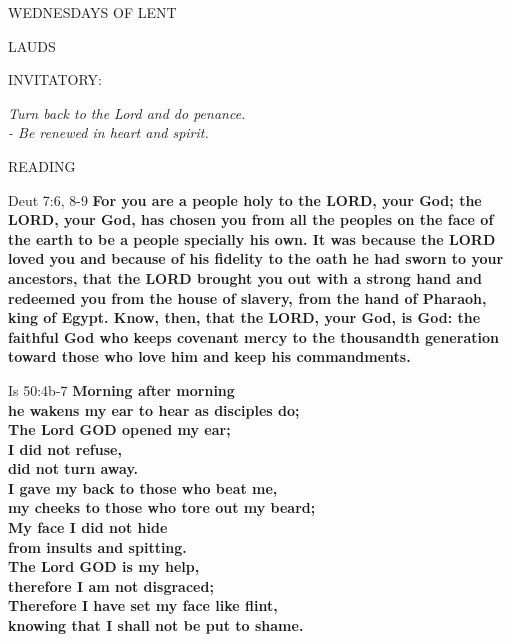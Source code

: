 \begin{center}
\normalsize WEDNESDAYS OF LENT
\end{center}

\begin{flushleft}\normalsize{\uppercase{LAUDS\\}}\end{flushleft}
\small{\uppercase{INVITATORY:}}\normalsize
\begin{center}
\textit{Turn back to the Lord and do penance.\\}
\textit{- Be renewed in heart and spirit.\\}
\end{center}
\noindent\small READING
\begin{description}[labelindent=\parindent, leftmargin=*]
\item [Ash Wednesday \& Weeks 1-4:]     Deut 7:6, 8-9 \textbf{    For you are a people holy to the LORD, your God; the LORD, your God, has chosen you from all the peoples on the face of the earth to be a people specially his own. It was because the LORD loved you and because of his fidelity to the oath he had sworn to your ancestors, that the LORD brought you out with a strong hand and redeemed you from the house of slavery, from the hand of Pharaoh, king of Egypt. Know, then, that the LORD, your God, is God: the faithful God who keeps covenant mercy to the thousandth generation toward those who love him and keep his commandments.\\}
\item [Week 5:]    Is 50:4b-7    \textbf{Morning after morning\\
he wakens my ear to hear as disciples do;\\
The Lord GOD opened my ear;\\
I did not refuse,\\
did not turn away.\\
I gave my back to those who beat me,\\
my cheeks to those who tore out my beard;\\
My face I did not hide\\
from insults and spitting.\\
The Lord GOD is my help,\\
therefore I am not disgraced;\\
Therefore I have set my face like flint,\\
knowing that I shall not be put to shame.}
\end{description}

